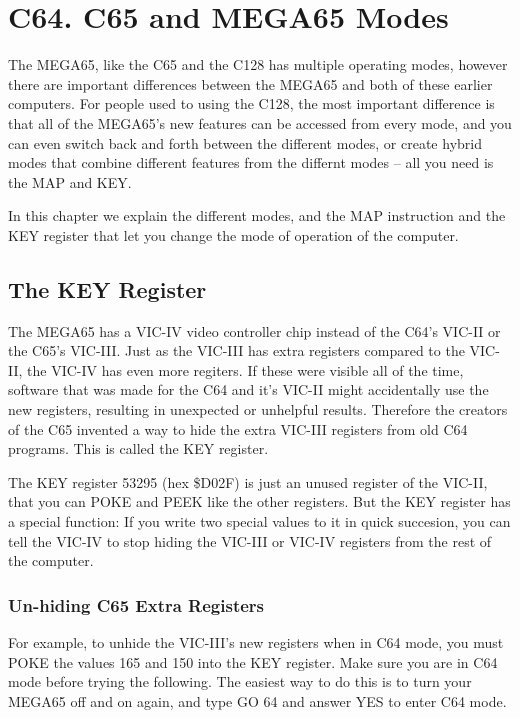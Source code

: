 \chapter {C64. C65 and MEGA65 Modes}

The MEGA65, like the C65 and the C128 has multiple operating modes,
however there are important differences between the MEGA65 and both
of these earlier computers.  For people used to using the C128,
the most important difference is that all of the MEGA65's new features
can be accessed from every mode, and you can even switch back and forth
between the different modes, or create hybrid modes that combine different
features from the differnt modes -- all you need is the MAP and KEY.

In this chapter we explain the different modes, and the MAP instruction and
the KEY register that let you change the mode of operation of the computer.

\section{The KEY Register}

The MEGA65 has a VIC-IV video controller chip instead of the C64's VIC-II or
the C65's VIC-III.  Just as the VIC-III has extra registers compared to the
VIC-II, the VIC-IV has even more regiters.  If these were visible all of the time,
software that was made for the C64 and it's VIC-II might accidentally use the
new registers, resulting in unexpected or unhelpful results.  Therefore the
creators of the C65 invented a way to hide the extra VIC-III registers from old
C64 programs. This is called the KEY register.

The KEY register 53295 (hex \$D02F) is just an unused register of the VIC-II, that you can POKE and
PEEK like the other registers.  But the KEY register has a special function: If
you write two special values to it in quick succesion, you can tell the VIC-IV
to stop hiding the VIC-III or VIC-IV registers from the rest of the computer.

\subsection{Un-hiding C65 Extra Registers}

For example, to unhide the VIC-III's new registers when in C64 mode, you must POKE the values 165 and 150
into the KEY register. Make sure you are in C64 mode before trying the following.  The easiest way to do this
is to turn your MEGA65 off and on again, and type GO 64 and answer YES to enter C64 mode.

